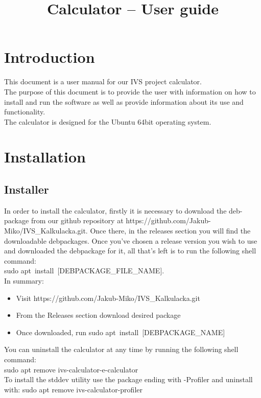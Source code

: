 \documentclass{article}
\title{Calculator -- User guide}
\date{}
\begin{document}
	\maketitle
	
	\tableofcontents
	
	\newpage
	
\section{Introduction}
	This document is a user manual for our IVS project calculator.\\
	The purpose of this document is to provide the user with information on how to install and run the software as well as provide information about its use and functionality.\\
	The calculator is designed for the Ubuntu 64bit operating system.
	\newpage
	
\section{Installation}
	\subsection{Installer}
	In order to install the calculator, firstly it is necessary to download the deb-package from our github repository at https://github.com/Jakub-Miko/IVS\_Kalkulacka.git. Once there, in the releases section you will find the downloadable debpackages. Once you've chosen a release version you wish to use and downloaded the debpackage for it, all that's left is to run the following shell command: \\sudo apt\ install\ [DEBPACKAGE\_FILE\_NAME].\\
	In summary:
 \begin{itemize}
    \item{Visit https://github.com/Jakub-Miko/IVS\_Kalkulacka.git}
	 \item{From the Releases section download desired package}
	 \item{Once downloaded, run sudo apt\ install\ [DEBPACKAGE\_NAME]}
 \end{itemize}
	You can uninstall the calculator at any time by running the following shell command:\\
	sudo apt remove ivs-calculator-e-calculator
\\[5pt]
    To install the stddev utility use the package ending with -Profiler and uninstall with: sudo apt remove ivs-calculator-profiler
\end{document}
